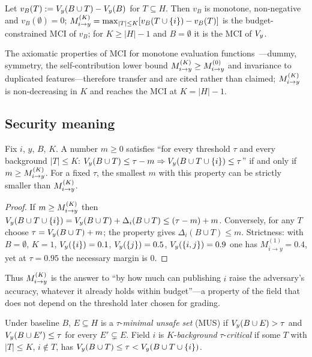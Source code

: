 \begin{proposition}\label{prop:mci}
Let $v_B(T) := V_{y}(B \cup T) - V_{y}(B)$ for $T \subseteq H$. Then $v_B$ is monotone,
non-negative and $v_B(\emptyset)=0$; $M^{(K)}_{i \to y} = \max_{|T|\le K}[v_B(T\cup\{i\}) - v_B(T)]$ is the
budget-constrained MCI of $v_B$; for $K \ge |H|-1$ and $B=\emptyset$ it is the MCI of $V_{y}$.
\end{proposition}
The axiomatic properties of MCI for monotone evaluation functions~\cite{catav2021mci}---dummy,
symmetry, the self-contribution lower bound $M^{(K)}_{i \to y}\ge M^{(0)}_{i\to y}$ and invariance to
duplicated features---therefore transfer and are cited rather than claimed; $M^{(K)}_{i \to y}$ is
non-decreasing in $K$ and reaches the MCI at $K=|H|-1$.

\subsection{Security meaning}
\begin{theorem}\label{thm:margin}
Fix $i$, $y$, $B$, $K$. A number $m\ge 0$ satisfies ``for every threshold $\tau$ and every
background $|T|\le K$: $V_{y}(B\cup T)\le\tau-m \Rightarrow V_{y}(B\cup T\cup\{i\})\le\tau$''
if and only if $m\ge M^{(K)}_{i \to y}$. For a fixed $\tau$, the smallest $m$ with this property can be
strictly smaller than $M^{(K)}_{i \to y}$.
\end{theorem}
\begin{proof}
If $m\ge M^{(K)}_{i \to y}$ then $V_{y}(B\cup T\cup\{i\})=V_{y}(B\cup T)+\Delta_i(B\cup T)\le(\tau-m)+m$.
Conversely, for any $T$ choose $\tau=V_{y}(B\cup T)+m$; the property gives $\Delta_i(B\cup T)\le
m$. Strictness: with $B=\emptyset$, $K=1$, $V_{y}(\{i\})=0.1$, $V_{y}(\{j\})=0.5$,
$V_{y}(\{i,j\})=0.9$ one has $M^{(1)}_{i\to y}=0.4$, yet at $\tau=0.95$ the necessary margin is $0$.
\end{proof}
Thus $M^{(K)}_{i \to y}$ is the answer to ``by how much can publishing $i$ raise the adversary's accuracy,
whatever it already holds within budget''---a property of the field that does not depend on
the threshold later chosen for grading.

\begin{definition}
Under baseline $B$, $E\subseteq H$ is a $\tau$-\emph{minimal unsafe set} (MUS) if
$V_{y}(B\cup E)>\tau$ and $V_{y}(B\cup E')\le\tau$ for every $E'\subsetneq E$. Field $i$ is
$K$-\emph{background} $\tau$-\emph{critical} if some $T$ with $|T|\le K$, $i\notin T$, has
$V_{y}(B\cup T)\le\tau<V_{y}(B\cup T\cup\{i\})$.
\end{definition}

